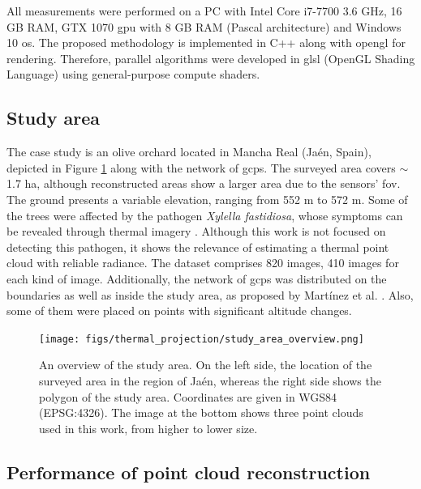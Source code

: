 All measurements were performed on a PC with Intel Core i7-7700 3.6 GHz, 16 GB RAM, GTX 1070 \acrshort{gpu} with 8 GB RAM (Pascal architecture) and Windows 10 \acrshort{os}. The proposed methodology is implemented in C++ along with \acrshort{opengl} for rendering. Therefore, parallel algorithms were developed in \acrshort{glsl} (OpenGL Shading Language) using general-purpose compute shaders. 

\subsection{Study area}

The case study is an olive orchard located in Mancha Real (Jaén, Spain), depicted in Figure \ref{fig:thermal_study_area} along with the network of \acrshort{gcp}s. The surveyed area covers  $\sim$ 1.7 \si{\hectare}, although reconstructed areas show a larger area due to the sensors' \acrshort{fov}. The ground presents a variable elevation, ranging from 552 \si{\meter} to 572 \si{\meter}. Some of the trees were affected by the pathogen \textit{Xylella fastidiosa}, whose symptoms can be revealed through thermal imagery \cite{zarco-tejada_previsual_2018}. Although this work is not focused on detecting this pathogen, it shows the relevance of estimating a thermal point cloud with reliable radiance. The dataset comprises 820 images, 410 images for each kind of image. Additionally, the network of \acrshort{gcp}s was distributed on the boundaries as well as inside the study area, as proposed by Martínez et al. \cite{martinez-carricondo_assessment_2018}. Also, some of them were placed on points with significant altitude changes.

\begin{figure}[ht]
    \centering
    \texttt{[image: figs/thermal\_projection/study\_area\_overview.png]}
    \caption{An overview of the study area. On the left side, the location of the surveyed area in the region of Jaén, whereas the right side shows the polygon of the study area. Coordinates are given in WGS84 (EPSG:4326). The image at the bottom shows three point clouds used in this work, from higher to lower size. }
	\label{fig:thermal_study_area}
\end{figure}

\subsection{Performance of point cloud reconstruction}

